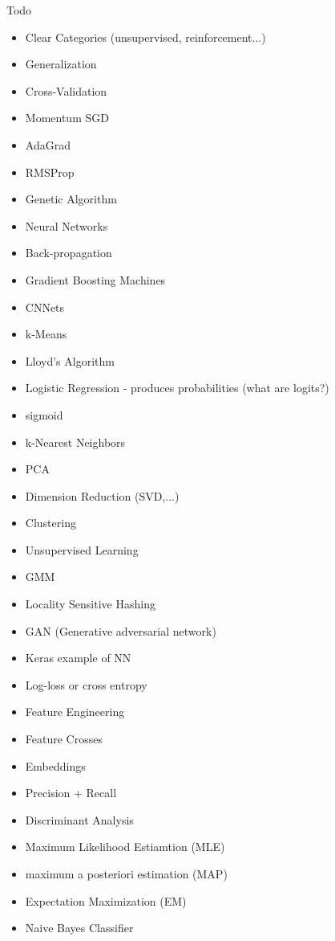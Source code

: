 \documentclass{cognito}
\begin{document}
\begin{question}{Todo}
	\begin{itemize}
		\item Clear Categories (unsupervised, reinforcement...)
		\item Generalization
		\item Cross-Validation
		\item Momentum SGD
		\item AdaGrad
		\item RMSProp
		\item Genetic Algorithm
		\item Neural Networks
		\item Back-propagation
		\item Gradient Boosting Machines
		\item CNNets
		\item k-Means
		\item Lloyd's Algorithm
		\item Logistic Regression - produces probabilities (what are logits?)
		\item sigmoid
		\item k-Nearest Neighbors
		\item PCA
		\item Dimension Reduction (SVD,...)
		\item Clustering
		\item Unsupervised Learning
		\item GMM
		\item Locality Sensitive Hashing
		\item GAN (Generative adversarial network)
		\item Keras example of NN
		\item Log-loss or cross entropy
		\item Feature Engineering
		\item Feature Crosses
		\item Embeddings
		\item Precision + Recall 
		\item Discriminant Analysis
		\item Maximum Likelihood Estiamtion (MLE)
		\item maximum a posteriori estimation (MAP)
		\item Expectation Maximization (EM)
		\item Naive Bayes Classifier
	\end{itemize}
\end{question}
\end{document}
